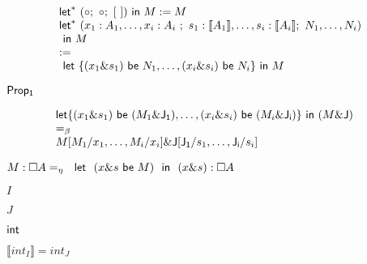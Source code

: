 \documentclass[10pt]{book}
\begin{document}
\begin{mdSnippets}
\begin{mdDisplaySnippet}[da02a185ef154ce7afe5b2a8366cc885]
\[\begin{array}{l}
\nonumber {\sf let}^{*}\ (\circ;\ \circ;\  [\ ]) {\ \sf in\ }  M:= M \ \\
\nonumber {\sf let}^{*}\ (x_1:A_1,\ldots, x_i:A_i\ ;\  s_1: \llbracket A_1\rrbracket, \ldots, s_i:\llbracket A_i\rrbracket;\  N_1,\ldots,  N_i)  \\
{\ \sf in\ } M \\:= \\
\ {\sf let} \ \{(x_1 \& s_1)\  {\sf be}\  N_1,\ldots,  (x_i \& s_i)\  {\sf be}\  N_i\}\ {\sf in}\  M \\
\end{array}
\]%
\end{mdDisplaySnippet}%
\begin{mdInlineSnippet}%
${\sf  Prop_1 }$\end{mdInlineSnippet}%
\begin{mdDisplaySnippet}[0e5a81dfbdfd8fd79ba785af4bc46b87]%
\[%
\begin{array}{ll} 
  {\sf let} \{(x_1 \& s_1) {\ \sf be\ } (M_1\& {\sf J_1}),\ldots,  (x_i \& s_i) {\ {\sf be}\ } (M_i\& {\sf J_i})\}\ {\sf in}\  (M \&  {\sf J})& \\
  =_{\beta} & \\
{  M[M_1/x_1, \ldots,  M_i/x_i] \& {\sf J}[{\sf J_1}/s_1,\ldots, {\sf J_i}/s_i]}
  \end{array}
\]%
\end{mdDisplaySnippet}%
\begin{mdInlineSnippet}%
$M:\Box A =_{\eta}\ \ {\sf let} \ \ (x \& s\  {\sf be} \ M)\ \ {\sf in}\ \  { (x \& s)}:\Box A$\end{mdInlineSnippet}%
\begin{mdInlineSnippet}[dd7536794b63bf90eccfd37f9b147d7f]%
$I$\end{mdInlineSnippet}%
\begin{mdInlineSnippet}%
$J$\end{mdInlineSnippet}%
\begin{mdInlineSnippet}[5816dd164bf4957e60b9dc378faadd4a]%
${\sf int}$\end{mdInlineSnippet}%
\begin{mdInlineSnippet}[168da4daa211ad39e7e2f103d4697538]%
$\llbracket int_I\rrbracket = int_J $\end{mdInlineSnippet}%

\end{mdSnippets}
\end{document}
